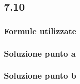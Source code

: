 \documentclass[../../main.tex]{subfiles}
\begin{document}
\subsection*{7.10}
\subsubsection*{Formule utilizzate}
\subsubsection*{Soluzione punto a}
\subsubsection*{Soluzione punto b}
\newpage
\end{document}
